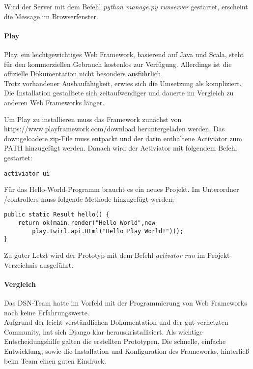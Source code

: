 Wird der Server mit dem Befehl \textit{python manage.py runserver} gestartet, erscheint die Message im Browserfenster.

\paragraph{Play}
Play, ein leichtgewichtiges Web Framework, basierend auf Java und Scala, steht für den kommerziellen Gebrauch kostenlos zur Verfügung. Allerdings ist die offizielle Dokumentation nicht besonders ausführlich.\\
Trotz vorhandener Ausbaufähigkeit, erwies sich die Umsetzung als kompliziert. Die Installation gestalltete sich zeitaufwendiger und dauerte im Vergleich zu anderen Web Frameworks länger.\cite{PLAY}

Um Play zu installieren muss das Framework zunächst von\\
https://www.playframework.com/download heruntergeladen werden. Das downgeloadete zip-File muss entpackt und der darin enthaltene Activiator zum PATH hinzugefügt werden. Danach wird der Activiator mit folgendem Befehl gestartet\cite{PLAYCON}:
\begin{lstlisting}[caption={Konifiguration von Play \cite{PLAYCON}}]
activiator ui
\end{lstlisting}

Für das \grqq{}Hello-World\grqq{}-Programm braucht es ein neues Projekt. Im Unterordner /controllers muss folgende Methode hinzugefügt werden:

\begin{lstlisting}[caption={Play Hello-World \cite{PLAYCON}}]
public static Result hello() {
	return ok(main.render("Hello World",new
		play.twirl.api.Html("Hello Play World!")));
}
\end{lstlisting}

Zu guter Letzt wird der Prototyp mit dem Befehl \textit{activator run} im Projekt-Verzeichnis ausgeführt.

\paragraph{Vergleich}
Das DSN-Team hatte im Vorfeld mit der Programmierung von Web Frameworks noch keine Erfahrungswerte. \\
Aufgrund der leicht verständlichen Dokumentation und der gut vernetzten Community, hat sich Django klar herauskristallisiert. Als wichtige Entscheidungshilfe galten die erstellten Prototypen. Die schnelle, einfache Entwicklung, sowie die Installation und Konfiguration des Frameworks, hinterließ beim Team einen guten Eindruck.


